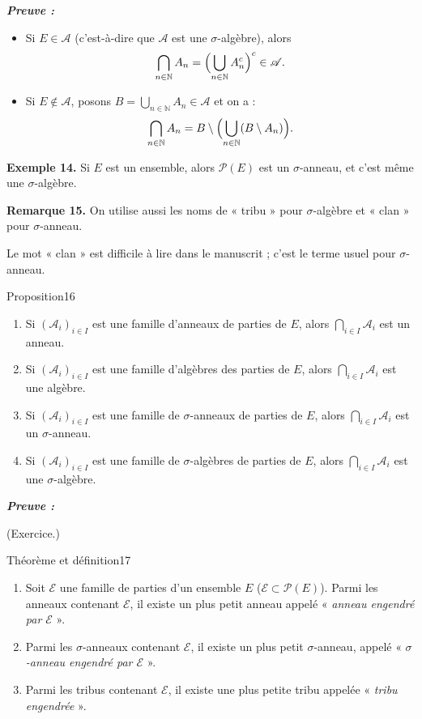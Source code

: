 \documentclass[11pt,a4paper]{article}
\newcommand{\N}{\mathbb{N}}
\newcommand{\A}{\mathscr{A}}
\newcommand{\Pp}{\mathscr{P}}
\newcommand{\Ee}{\mathscr{E}}
\newenvironment{preuve}{\par\textit{\textbf{Preuve :}}\par\nopagebreak[4]}{\par}
\begin{document}
\begin{preuve}\end{preuve}
\begin{itemize}[leftmargin=1.2cm]
  \item Si $E\in\A$ (c'est-à-dire que $\A$ est une $\sigma$-algèbre), alors
  \[
    \bigcap_{n\in\N}A_n=\Bigl(\bigcup_{n\in\N}A_n^{c}\Bigr)^{c}\in\A .
  \]
  \item Si $E\notin\A$, posons $B=\displaystyle\bigcup_{n\in\N}A_n\in\A$ et on a :
  \[
    \bigcap_{n\in\N}A_n=B\setminus\Bigl(\bigcup_{n\in\N}(B\setminus A_n)\Bigr).
  \]
\end{itemize}

\textbf{\color{bleu}Exemple 14.}
Si $E$ est un ensemble, alors $\Pp(E)$ est un $\sigma$-anneau, et c'est même une $\sigma$-algèbre.

\textbf{\color{bleu}Remarque 15.}
On utilise aussi les noms de « tribu » pour $\sigma$-algèbre et « clan » pour $\sigma$-anneau.

\begin{note}
Le mot « clan » est difficile à lire dans le manuscrit ; c'est le terme usuel pour $\sigma$-anneau.
\end{note}

\begin{enonce}{Proposition}{16}
\begin{enumerate}[label=\textbf{\arabic*)},leftmargin=1.2cm]
  \item Si $(\A_i)_{i\in I}$ est une famille d'anneaux de parties de $E$, alors $\bigcap_{i\in I}\A_i$ est un anneau.
  \item Si $(\A_i)_{i\in I}$ est une famille d'algèbres des parties de $E$, alors $\bigcap_{i\in I}\A_i$ est une algèbre.
  \item Si $(\A_i)_{i\in I}$ est une famille de $\sigma$-anneaux de parties de $E$, alors $\bigcap_{i\in I}\A_i$ est un $\sigma$-anneau.
  \item Si $(\A_i)_{i\in I}$ est une famille de $\sigma$-algèbres de parties de $E$, alors $\bigcap_{i\in I}\A_i$ est une $\sigma$-algèbre.
\end{enumerate}
\end{enonce}

\begin{preuve}\end{preuve}
(Exercice.)

\begin{enonce}{Théorème et définition}{17}
\begin{enumerate}[label=\textbf{\arabic*.},leftmargin=1.2cm]
  \item Soit $\Ee$ une famille de parties d'un ensemble $E$ ($\Ee\subset\Pp(E)$). Parmi les anneaux contenant $\Ee$,
        il existe un plus petit anneau appelé « \emph{anneau engendré par $\Ee$} ».
  \item Parmi les $\sigma$-anneaux contenant $\Ee$, il existe un plus petit $\sigma$-anneau, appelé
        « \emph{$\sigma$-anneau engendré par $\Ee$} ».
  \item Parmi les tribus contenant $\Ee$, il existe une plus petite tribu appelée « \emph{tribu engendrée} ».
\end{enumerate}
\end{enonce}
\end{document}
